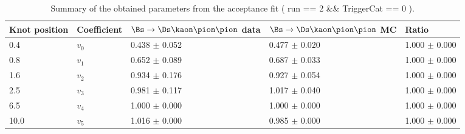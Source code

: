 \begin{table}[h]
\centering
\caption{Summary of the obtained parameters from the acceptance fit ( run == 2 && TriggerCat == 0 ).} 
\begin{tabular}{l l l l l}
\hline
\hline
Knot position & Coefficient & $\Bs\to\Ds\kaon\pion\pion$ data & $\Bs\to\Ds\kaon\pion\pion$ MC & Ratio \\
\hline
0.4 & $v_{0}$ & 0.438 $\pm$ 0.052 & 0.477 $\pm$ 0.020 & 1.000 $\pm$ 0.000\\
0.8 & $v_{1}$ & 0.652 $\pm$ 0.089 & 0.687 $\pm$ 0.033 & 1.000 $\pm$ 0.000\\
1.6 & $v_{2}$ & 0.934 $\pm$ 0.176 & 0.927 $\pm$ 0.054 & 1.000 $\pm$ 0.000\\
2.5 & $v_{3}$ & 0.981 $\pm$ 0.117 & 1.017 $\pm$ 0.040 & 1.000 $\pm$ 0.000\\
6.5 & $v_{4}$ & 1.000 $\pm$ 0.000 & 1.000 $\pm$ 0.000 & 1.000 $\pm$ 0.000\\
10.0 & $v_{5}$ & 1.016 $\pm$ 0.000 & 0.985 $\pm$ 0.000 & 1.000 $\pm$ 0.000\\
\hline
\hline
\end{tabular}
\label{table:splines}
\end{table}
